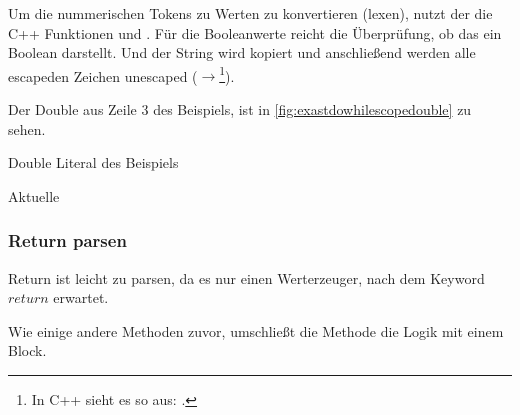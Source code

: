 {{      Um die nummerischen Tokens zu Werten zu konvertieren (lexen), nutzt der  die C++ Funktionen  und . Für die Booleanwerte reicht die Überprüfung, ob das  ein Boolean darstellt. Und der String wird kopiert und anschließend werden alle escapeden Zeichen unescaped ($\rightarrow$\footnote{
        In C++ sieht es so aus: \usebox{\myMinSavBox}.
      }).

      Der Double aus Zeile 3 des Beispiels, ist in \autoref{fig:exastdowhilescopedouble} zu sehen.
      \begin{paracol}{2}
        \begin{myCodeEnv}
          \centering
          \begin{myInvBox}[width=.9\linewidth]
            
          \end{myInvBox}
          \caption{Double Literal des Beispiels}
          \label{fig:exastdowhilescopedouble}
        \end{myCodeEnv}
        \switchcolumn
        \begin{myCodeEnv}
          \centering
          \begin{myInvBox}[width=.9\linewidth]
            
          \end{myInvBox}
          \caption*{Aktuelle }
        \end{myCodeEnv}
      \end{paracol}

    \subsubsection{Return parsen}
    \label{sssec:Return parsen}
      Return ist leicht zu parsen, da es nur einen Werterzeuger, nach dem Keyword \myRIn$return$ erwartet.

      Wie einige andere Methoden zuvor, umschließt die  Methode die Logik mit einem  Block.

}}

